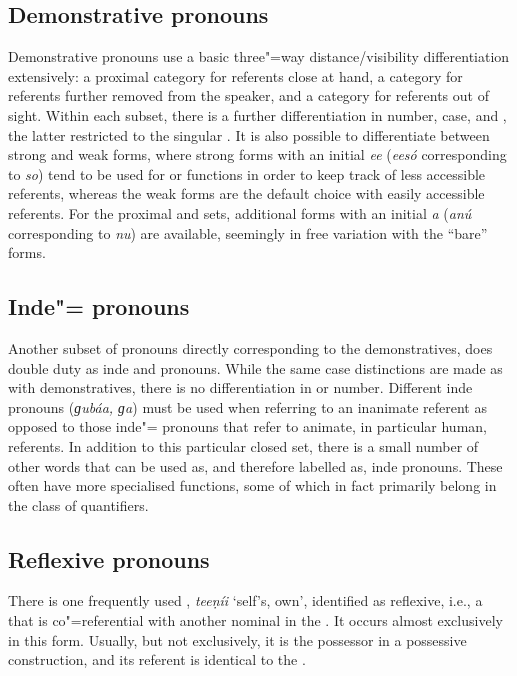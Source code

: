 \subsection{Demonstrative pronouns}
\label{subsec:3b-6-2}
Demonstrative pronouns use a basic three"=way distance/visibility differentiation extensively: a proximal category for referents close at hand, a  category for referents further removed from the speaker, and a  category for referents out of sight. Within each subset, there is a further differentiation in number, case, and , the latter restricted to the singular . It is also possible to differentiate between strong and weak forms, where strong forms with an initial \textit{ee} (\textit{eesó} corresponding to \textit{so}) tend to be used for  or  functions in order to keep track of less accessible  referents, whereas the weak forms are the default choice with easily accessible  referents. For the proximal and  sets, additional forms with an initial \textit{a} (\textit{anú} corresponding to \textit{nu}) are available, seemingly in free variation with the ``bare'' forms.


\subsection{Inde"= pronouns}
\label{subsec:3b-6-3}
Another subset of pronouns directly corresponding to the demonstratives, does double duty as inde and  pronouns. While the same case distinctions are made as with demonstratives, there is no differentiation in  or number. Different inde pronouns (\textit{ɡubáa, ɡa}) must be used when referring to an inanimate referent as opposed to those inde"= pronouns that refer to animate, in particular human, referents. In addition to this particular closed set, there is a small number of other words that can be used as, and therefore labelled as, inde pronouns. These often have more specialised functions, some of which in fact primarily belong in the class of quantifiers.


\subsection{Reflexive pronouns}
\label{subsec:3b-6-4}
There is one frequently used , \textit{teeṇíi} `self’s, own', identified as reflexive, i.e., a  that is co"=referential with another nominal in the . It occurs almost exclusively in this form. Usually, but not exclusively, it is the possessor in a possessive construction, and its referent is identical to the  .


